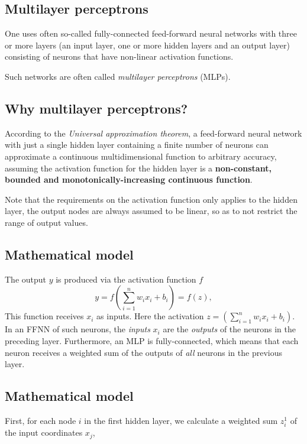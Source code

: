 \documentclass[%
oneside,                 %
final,                   %
10pt]{article}
\begin{document}
\subsection*{Multilayer perceptrons}

One uses often so-called fully-connected feed-forward neural networks
with three or more layers (an input layer, one or more hidden layers
and an output layer) consisting of neurons that have non-linear
activation functions.

Such networks are often called \emph{multilayer perceptrons} (MLPs).

\subsection*{Why multilayer perceptrons?}

According to the \emph{Universal approximation theorem}, a feed-forward
neural network with just a single hidden layer containing a finite
number of neurons can approximate a continuous multidimensional
function to arbitrary accuracy, assuming the activation function for
the hidden layer is a \textbf{non-constant, bounded and
monotonically-increasing continuous function}.

Note that the requirements on the activation function only applies to
the hidden layer, the output nodes are always assumed to be linear, so
as to not restrict the range of output values.


\subsection*{Mathematical model}

The output $y$ is produced via the activation function $f$
\[
 y = f\left(\sum_{i=1}^n w_ix_i + b_i\right) = f(z),
\]
This function receives $x_i$ as inputs.
Here the activation $z=(\sum_{i=1}^n w_ix_i+b_i)$. 
In an FFNN of such neurons, the \emph{inputs} $x_i$ are the \emph{outputs} of
the neurons in the preceding layer. Furthermore, an MLP is
fully-connected, which means that each neuron receives a weighted sum
of the outputs of \emph{all} neurons in the previous layer.

\subsection*{Mathematical model}

First, for each node $i$ in the first hidden layer, we calculate a weighted sum $z_i^1$ of the input coordinates $x_j$,
\end{document}
